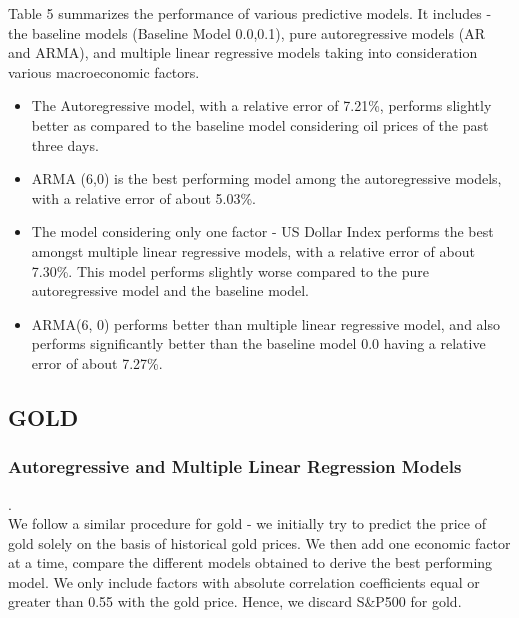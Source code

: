 \documentclass[runningheads]{llncs}
\begin{document}
\noindent Table 5 summarizes the performance of various predictive models. It includes - the baseline models (Baseline Model 0.0,0.1), pure autoregressive models (AR and ARMA), and multiple linear regressive models taking into consideration various macroeconomic factors.

\begin{itemize}

\item The Autoregressive model, with a relative error of 7.21\%, performs slightly better as compared to the baseline model considering oil prices of the past three days. \\

\item ARMA (6,0) is the best performing model among the autoregressive models, with a relative error of about 5.03\%.\\

\item The model considering only one factor - US Dollar Index performs the best amongst multiple linear regressive models, with a relative error of about 7.30\%. This model performs slightly worse compared to the pure autoregressive model and the baseline model.\\

\item ARMA(6, 0) performs better than multiple linear regressive model, and also performs significantly better than the baseline model 0.0 having a relative error of about 7.27\%.\\

\end{itemize}

\newpage
\subsection {GOLD}

\subsubsection {Autoregressive and Multiple Linear Regression Models}.\\

We follow a similar procedure for gold - we initially try to predict the price of gold solely on the basis of historical gold prices. We then add one economic factor at a time, compare the different models obtained to derive the best performing model. We only include factors with absolute correlation coefficients equal or greater than 0.55 with the gold price. Hence, we discard S\&P500 for gold.
\end{document}
